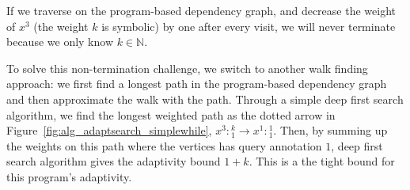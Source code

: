 %
If we traverse on the program-based dependency graph, and decrease the weight of $x^3$ (the weight $k$ is symbolic) by one after every visit,
we will never terminate because we only know $k \in \mathbb{N}$.

To solve this non-termination challenge, we switch to another walk finding approach: we first find a  longest path in the program-based dependency graph and then approximate the walk with the path.
Through a simple deep first search algorithm, we find the longest weighted path as the dotted arrow in Figure~\ref{fig:alg_adaptsearch_simplewhile},
$x^3: {}^k_1 \to x^1: {}^1_1 $.
Then, by summing up the weights on this path where the vertices has query annotation $1$, deep first search algorithm gives the adaptivity bound $1 + k$.
This is a the tight bound for this program's adaptivity.

